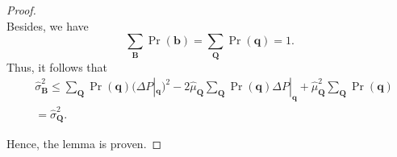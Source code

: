 \documentclass[twoside,leqno,twocolumn]{article}
\begin{document}
\begin{proof}
\begin{equation*}
\end{equation*}
Besides, we have
\begin{equation*}
\sum_{\mathbf{B}}\Pr(\mathbf{b})=\sum_{\mathbf{Q}}\Pr(\mathbf{q})=1.
\end{equation*}
Thus, it follows that
\begin{equation*}
\begin{split}
& \hat{\sigma}_{\mathbf{B}}^{2} \leq \sum_{\mathbf{Q}}\Pr(\mathbf{q})(\Delta P|_{\mathbf{q}})^{2} -2\hat{\mu}_{\mathbf{Q}}\sum_{\mathbf{Q}}\Pr(\mathbf{q})\Delta P|_{\mathbf{q}} + \hat{\mu}_{\mathbf{Q}}^{2}\sum_{\mathbf{Q}}\Pr(\mathbf{q})\\
& =\hat{\sigma}_{\mathbf{Q}}^{2}.
\end{split}
\end{equation*}

Hence, the lemma is proven.
\end{proof}
\end{document}
